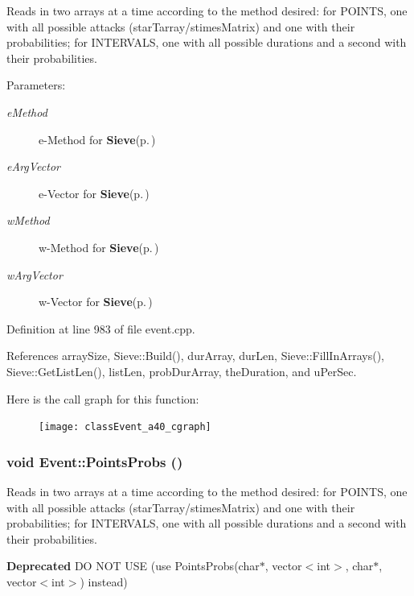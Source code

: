 Reads in two arrays at a time according to the method desired: for POINTS, one with all possible attacks (star\-Tarray/stimes\-Matrix) and one with their probabilities; for INTERVALS, one with all possible durations and a second with their probabilities. \begin{Desc}
\item[Parameters:]
\begin{description}
\item[{\em e\-Method}]e-Method for {\bf Sieve}{\rm (p.\,\pageref{classSieve})} \item[{\em e\-Arg\-Vector}]e-Vector for {\bf Sieve}{\rm (p.\,\pageref{classSieve})} \item[{\em w\-Method}]w-Method for {\bf Sieve}{\rm (p.\,\pageref{classSieve})} \item[{\em w\-Arg\-Vector}]w-Vector for {\bf Sieve}{\rm (p.\,\pageref{classSieve})} \end{description}
\end{Desc}


Definition at line 983 of file event.cpp.

References array\-Size, Sieve::Build(), dur\-Array, dur\-Len, Sieve::Fill\-In\-Arrays(), Sieve::Get\-List\-Len(), list\-Len, prob\-Dur\-Array, the\-Duration, and u\-Per\-Sec.

Here is the call graph for this function:\begin{figure}[H]
\begin{center}
\leavevmode
\texttt{[image: classEvent\_a40\_cgraph]}
\end{center}
\end{figure}
\subsubsection{\setlength{\rightskip}{0pt plus 5cm}void Event::Points\-Probs ()}\label{classEvent_a39}


Reads in two arrays at a time according to the method desired: for POINTS, one with all possible attacks (star\-Tarray/stimes\-Matrix) and one with their probabilities; for INTERVALS, one with all possible durations and a second with their probabilities. 

\begin{Desc}
\item[{\bf Deprecated}]DO NOT USE (use Points\-Probs(char$\ast$, vector$<$int$>$, char$\ast$, vector$<$int$>$) instead) \end{Desc}



